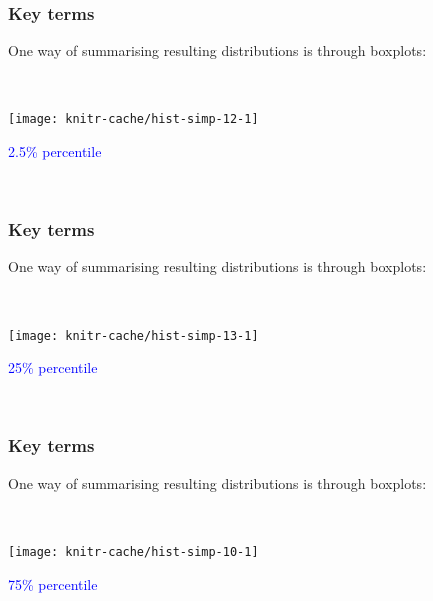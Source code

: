 

\begin{frame}
\frametitle{Key terms}

One way of summarising resulting distributions is through boxplots:

~\\

\begin{knitrout}
\color{fgcolor}
\texttt{[image: knitr-cache/hist-simp-12-1]}

\end{knitrout}
\textcolor{blue}{2.5\% percentile}  %

~\\

\end{frame}


\begin{frame}
\frametitle{Key terms}

One way of summarising resulting distributions is through boxplots:

~\\

\begin{knitrout}
\color{fgcolor}
\texttt{[image: knitr-cache/hist-simp-13-1]}

\end{knitrout}
\textcolor{blue}{25\% percentile}  %

~\\

\end{frame}


\begin{frame}
\frametitle{Key terms}

One way of summarising resulting distributions is through boxplots:

~\\

\begin{knitrout}
\color{fgcolor}
\texttt{[image: knitr-cache/hist-simp-10-1]}

\end{knitrout}
\textcolor{blue}{75\% percentile}  %

~\\

\end{frame}

